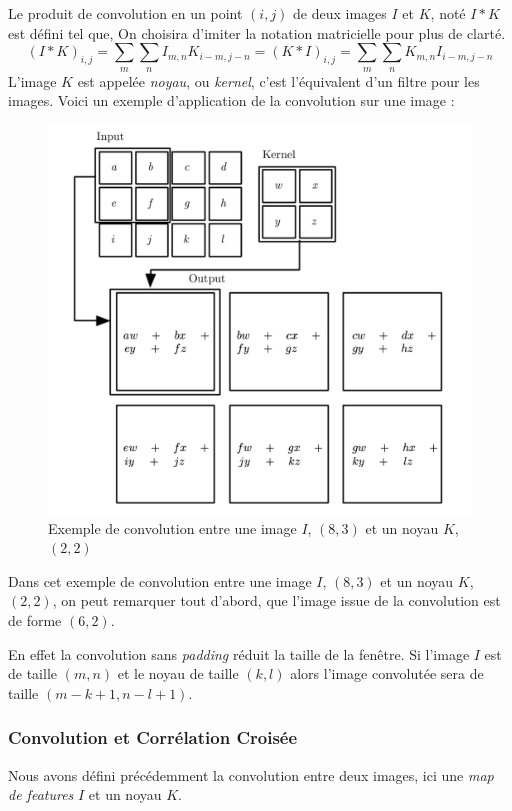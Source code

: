 \documentclass[a4paper, 11pt]{report}
\begin{document}
Le produit de convolution en un point $(i,j)$ de deux images $I$ et $K$, noté $I * K$ est défini tel que,
On choisira d'imiter la notation matricielle pour plus de clarté.
$$(I*K)_{i,j} = \sum_{m}\sum_{n}{I_{m,n}K_{i-m,j-n}} = (K*I)_{i,j} = \sum_{m}\sum_{n}{K_{m,n}I_{i-m,j-n}}$$
L'image $K$ est appelée \emph{noyau}, ou \emph{kernel}, c'est l'équivalent d'un filtre pour les images.
Voici un exemple d'application de la convolution sur une image :
\begin{figure}[H]
	\centering
	\includegraphics[scale=0.25]{Images/Convolution.png}
	\caption{Exemple de convolution entre une image $I$, $(8,3)$ et un noyau $K$, $(2,2)$}
\end{figure}
Dans cet exemple de convolution entre une image $I$, $(8,3)$ et un noyau $K$, $(2,2)$, on peut remarquer tout d'abord, que l'image issue de la convolution est de forme $(6,2)$.

En effet la convolution sans \emph{padding} réduit la taille de la fenêtre.
Si l'image $I$ est de taille $(m,n)$ et le noyau de taille $(k,l)$ alors l'image convolutée sera de taille $(m-k+1,n-l+1)$.
\subsubsection{Convolution et Corrélation Croisée}
Nous avons défini précédemment la convolution entre deux images, ici une \emph{map de features} $I$ et un noyau $K$.
\end{document}
